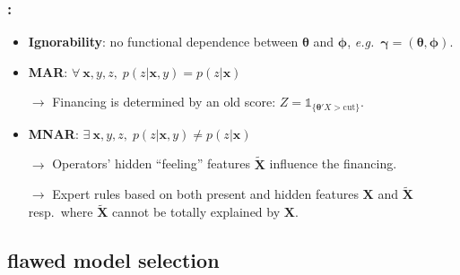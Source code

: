 \documentclass[english,xcolor={rgb,dvipsnames,table,usenames}, presentation]{beamer}
\begin{document}
\begin{frame}
\frametitle{\secname : \subsecname}


\note{}



\begin{itemize}
\item \textbf{Ignorability}: no functional dependence between $\bm{\theta}$ and $\bm{\phi}$, \textit{e.g.}\ $\bm{\gamma} = (\bm{\theta},\bm{\phi})$.

\item<2-> \textbf{MAR}: $\forall \: \bm{x},y,z, \; p(z| \bm{x},y) = p(z| \bm{x})$

$\rightarrow$ Financing is determined by an old score: $Z = \mathds{1}_{\{\bm{\theta}'X > \text{cut}\}}$.

\item<3-> \textbf{MNAR}: $\exists \: \bm{x},y,z, \; p(z| \bm{x},y) \neq p(z| \bm{x})$

$\rightarrow$ Operators' hidden ``feeling'' features $\tilde{\bm{X}}$ influence the financing.

$\rightarrow$ Expert rules based on both present and hidden features $\bm{X}$ and $\tilde{\bm{X}}$ resp.\ where $\tilde{\bm{X}}$ cannot be totally explained by $\bm{X}$.
\end{itemize}

\end{frame}




\subsection{flawed model selection}
\end{document}

